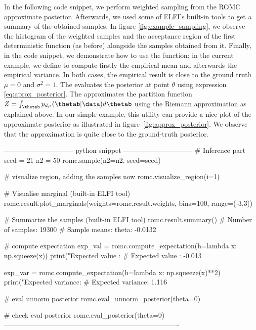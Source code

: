 In the following code snippet, we perform weighted sampling from the
ROMC approximate posterior. Afterwards, we used some of ELFI's
built-in tools to get a summary of the obtained samples. In figure
\ref{fig:example_sampling}, we observe the histogram of the weighted
samples and the acceptance region of the first deterministic function
(as before) alongside the samples obtained from it. Finally, in the
code snippet, we demonstrate how to use the 
function; in the current example, we define  to compute
firstly the empirical mean and afterwards the empirical variance. In
both cases, the empirical result is close to the ground truth
$\mu = 0$ and $\sigma^2 = 1$. The
 evaluates the posterior at
point $\theta$ using expression \eqref{eq:aprox_posterior}. The
 approximates the partition function
$Z = \int_{\thetab} p_{d,\epsilon}(\thetab|\data) d\thetab$ using the
Riemann approximation as explained above. In our simple example, this
utility can provide a nice plot of the approximate posterior as
illustrated in figure~\ref{fig:approx_posterior}. We observe that the
approximation is quite close to the ground-truth posterior.

\begin{Code}
------------------------------ python snippet ------------------------------  
  # Inference part
  seed = 21
  n2 = 50
  romc.sample(n2=n2, seed=seed)

  # visualize region, adding the samples now
  romc.visualize_region(i=1)

  # Visualise marginal (built-in ELFI tool)
  romc.result.plot_marginals(weights=romc.result.weights,
                             bins=100, range=(-3,3))

  # Summarize the samples (built-in ELFI tool)
  romc.result.summary()
  # Number of samples: 19300
  # Sample means: theta: -0.0132

  # compute expectation
  exp_val = romc.compute_expectation(h=lambda x: np.squeeze(x))
  print("Expected value   : %
  # Expected value   : -0.013

  exp_var = romc.compute_expectation(h=lambda x: np.squeeze(x)**2)
  print("Expected variance: %
  # Expected variance: 1.116

  # eval unnorm posterior
  romc.eval_unnorm_posterior(theta=0)

  # check eval posterior
  romc.eval_posterior(theta=0)
----------------------------------------------------------------------------
\end{Code}

